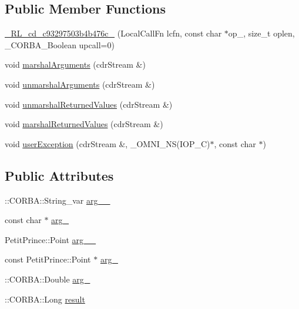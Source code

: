 \subsection*{Public Member Functions}
\begin{DoxyCompactItemize}
\item 
\hyperlink{class__0_r_l__cd__c93297503b4b476c__11000000_a1bb4893a79836d1d8bc3b28b56a7938a}{\+\_\+R\+L\+\_\+cd\+\_\+c93297503b4b476c\+\_} (Local\+Call\+Fn lcfn, const char $\ast$op\+\_\+, size\+\_\+t oplen, \+\_\+\+C\+O\+R\+B\+A\+\_\+\+Boolean upcall=0)
\item 
void \hyperlink{class__0_r_l__cd__c93297503b4b476c__11000000_a49560150918cbb146c8da79944df19c9}{marshal\+Arguments} (cdr\+Stream \&)
\item 
void \hyperlink{class__0_r_l__cd__c93297503b4b476c__11000000_abe687c880ef4f26e6b4001adfd828a07}{unmarshal\+Arguments} (cdr\+Stream \&)
\item 
void \hyperlink{class__0_r_l__cd__c93297503b4b476c__11000000_a053ad3b798898324014ca65e3e96920d}{unmarshal\+Returned\+Values} (cdr\+Stream \&)
\item 
void \hyperlink{class__0_r_l__cd__c93297503b4b476c__11000000_a5b1e30673b954c10405a8a652324088f}{marshal\+Returned\+Values} (cdr\+Stream \&)
\item 
void \hyperlink{class__0_r_l__cd__c93297503b4b476c__11000000_a8a923df033dc3177185f90d879451022}{user\+Exception} (cdr\+Stream \&, \+\_\+\+O\+M\+N\+I\+\_\+\+NS(I\+O\+P\+\_\+C)$\ast$, const char $\ast$)
\end{DoxyCompactItemize}
\subsection*{Public Attributes}
\begin{DoxyCompactItemize}
\item 
\+::C\+O\+R\+B\+A\+::\+String\+\_\+var \hyperlink{class__0_r_l__cd__c93297503b4b476c__11000000_abdc0a1fecfa33dd766c72760623a2bb0}{arg\+\_\+\_\+}
\item 
const char $\ast$ \hyperlink{class__0_r_l__cd__c93297503b4b476c__11000000_a028225d9a02bc49290dc044801396b57}{arg\+\_}
\item 
Petit\+Prince\+::\+Point \hyperlink{class__0_r_l__cd__c93297503b4b476c__11000000_a36cb208c9c1152cddc301d382e4fec23}{arg\+\_\+\_\+}
\item 
const Petit\+Prince\+::\+Point $\ast$ \hyperlink{class__0_r_l__cd__c93297503b4b476c__11000000_ab3cb660dcca4e79904955484dce2b56e}{arg\+\_}
\item 
\+::C\+O\+R\+B\+A\+::\+Double \hyperlink{class__0_r_l__cd__c93297503b4b476c__11000000_a67084e7fa5c434110e588481b53a61c2}{arg\+\_}
\item 
\+::C\+O\+R\+B\+A\+::\+Long \hyperlink{class__0_r_l__cd__c93297503b4b476c__11000000_a5e87affab2cb58f2a874bb8572df0486}{result}
\end{DoxyCompactItemize}
